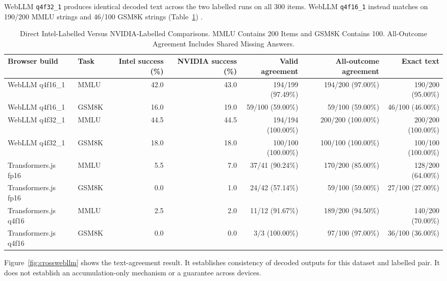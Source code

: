 \documentclass[conference]{IEEEtran}
\newcommand{\mlchalf}{\texttt{q4f16\_1}}
\newcommand{\mlcfull}{\texttt{q4f32\_1}}
\begin{document}
WebLLM \mlcfull{} produces identical decoded text across the
two labelled runs on all 300 items.
WebLLM \mlchalf{} instead matches on 190/200 MMLU strings and
46/100 GSM8K strings (Table~\ref{tab:cross})
\cite{repository}.

\begin{table}[t]
\caption{
Direct Intel-Labelled Versus NVIDIA-Labelled Comparisons.
MMLU Contains 200 Items and GSM8K Contains 100.
All-Outcome Agreement Includes Shared Missing Answers.
}
\label{tab:cross}
\centering
\footnotesize
\setlength{\tabcolsep}{6pt}
\begin{tabular}{@{}llrrrrr@{}}
\toprule
Browser build &
Task &
Intel success (\%) &
NVIDIA success (\%) &
Valid agreement &
All-outcome agreement &
Exact text\\
\midrule
WebLLM q4f16\_1 &
MMLU & 42.0 & 43.0 &
194/199 (97.49\%) & 194/200 (97.00\%) & 190/200 (95.00\%)\\

WebLLM q4f16\_1 &
GSM8K & 16.0 & 19.0 &
59/100 (59.00\%) & 59/100 (59.00\%) & 46/100 (46.00\%)\\

WebLLM q4f32\_1 &
MMLU & 44.5 & 44.5 &
194/194 (100.00\%) & 200/200 (100.00\%) & 200/200 (100.00\%)\\

WebLLM q4f32\_1 &
GSM8K & 18.0 & 18.0 &
100/100 (100.00\%) & 100/100 (100.00\%) & 100/100 (100.00\%)\\
\midrule
Transformers.js fp16 &
MMLU & 5.5 & 7.0 &
37/41 (90.24\%) & 170/200 (85.00\%) & 128/200 (64.00\%)\\

Transformers.js fp16 &
GSM8K & 0.0 & 1.0 &
24/42 (57.14\%) & 59/100 (59.00\%) & 27/100 (27.00\%)\\

Transformers.js q4f16 &
MMLU & 2.5 & 2.0 &
11/12 (91.67\%) & 189/200 (94.50\%) & 140/200 (70.00\%)\\

Transformers.js q4f16 &
GSM8K & 0.0 & 0.0 &
3/3 (100.00\%) & 97/100 (97.00\%) & 36/100 (36.00\%)\\
\bottomrule
\end{tabular}
\end{table}

Figure~\ref{fig:crosswebllm} shows the text-agreement result.
It establishes consistency of decoded outputs for this
dataset and labelled pair.
It does not establish an accumulation-only mechanism or a
guarantee across devices.
\end{document}

